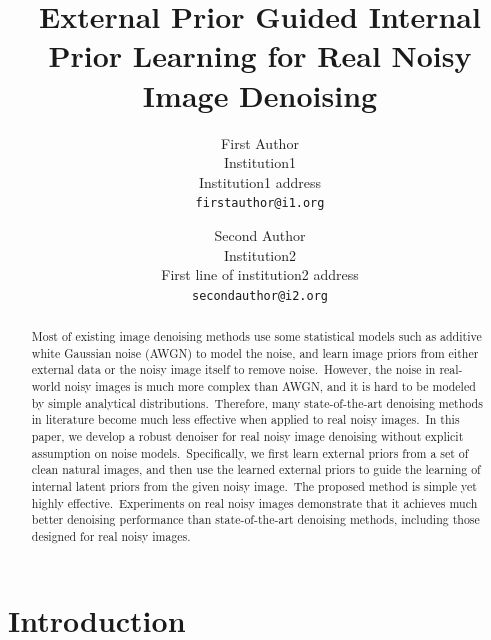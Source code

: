 \documentclass[10pt,twocolumn,letterpaper]{article}
\begin{document}
\title{External Prior Guided Internal Prior Learning for Real Noisy Image Denoising}

\author{First Author\\
Institution1\\
Institution1 address\\
{\tt\small firstauthor@i1.org}
\and
Second Author\\
Institution2\\
First line of institution2 address\\
{\tt\small secondauthor@i2.org}
}

\maketitle 


\begin{abstract}
Most of existing image denoising methods use some statistical models such as additive white Gaussian noise (AWGN) to model the noise, and learn image priors from either external data or the noisy image itself to remove noise.\ However, the noise in real-world noisy images is much more complex than AWGN, and it is hard to be modeled by simple analytical distributions.\ Therefore, many state-of-the-art denoising methods in literature become much less effective when applied to real noisy images.\ In this paper, we develop a robust denoiser for real noisy image denoising without explicit assumption on noise models.\ Specifically, we first learn external priors from a set of clean natural images, and then use the learned external priors to guide the learning of internal latent priors from the given noisy image.\ The proposed method is simple yet highly effective.\ Experiments on real noisy images demonstrate that it achieves much better denoising performance than state-of-the-art denoising methods, including those designed for real noisy images.
\end{abstract}

\section{Introduction} 
\end{document}
